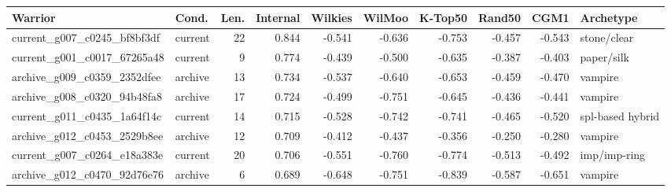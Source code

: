 \begin{tabular}{llrrrrrrrl}
\toprule
Warrior & Cond. & Len. & Internal & Wilkies & WilMoo & K-Top50 & Rand50 & CGM1 & Archetype \\
\midrule
current\_g007\_c0245\_bf8bf3df & current & 22 & 0.844 & -0.541 & -0.636 & -0.753 & -0.457 & -0.543 & stone/clear \\
current\_g001\_c0017\_67265a48 & current & 9 & 0.774 & -0.439 & -0.500 & -0.635 & -0.387 & -0.403 & paper/silk \\
archive\_g009\_c0359\_2352dfee & archive & 13 & 0.734 & -0.537 & -0.640 & -0.653 & -0.459 & -0.470 & vampire \\
archive\_g008\_c0320\_94b48fa8 & archive & 17 & 0.724 & -0.499 & -0.751 & -0.645 & -0.436 & -0.441 & vampire \\
current\_g011\_c0435\_1a64f14c & current & 14 & 0.715 & -0.528 & -0.742 & -0.741 & -0.465 & -0.520 & spl-based hybrid \\
archive\_g012\_c0453\_2529b8ee & archive & 12 & 0.709 & -0.412 & -0.437 & -0.356 & -0.250 & -0.280 & vampire \\
current\_g007\_c0264\_e18a383e & current & 20 & 0.706 & -0.551 & -0.760 & -0.774 & -0.513 & -0.492 & imp/imp-ring \\
archive\_g012\_c0470\_92d76e76 & archive & 6 & 0.689 & -0.648 & -0.751 & -0.839 & -0.587 & -0.651 & vampire \\
\bottomrule
\end{tabular}

